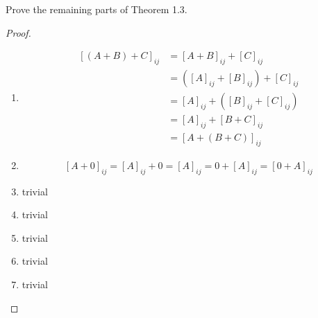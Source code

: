 \begin{problem} \label{P.1.5}
    Prove the remaining parts of Theorem 1.3. 
    
    \begin{proof}
        \begin{enumerate}
            \item
            \begin{align*}
            \left[(A+B)+C\right]_{ij} &= \left[A+B\right]_{ij} + \left[C\right]_{ij} \\
            &= (\left[A\right]_{ij} + \left[B\right]_{ij}) + \left[C\right]_{ij} \\
            &= \left[A\right]_{ij} + (\left[B\right]_{ij} + \left[C\right]_{ij}) \\
            &= \left[A\right]_{ij} + \left[B+C\right]_{ij} \\
            &= \left[A+(B+C)\right]_{ij}
            \end{align*}
            
            \item
            \[
            \left[ A+0 \right]_{ij} = \left[ A \right]_{ij} + 0 = \left[ A \right]_{ij} = 0 + \left[ A \right]_{ij} = \left[ 0+A \right]_{ij}
            \]
            
            \item trivial
            
            \item trivial
            
            \item trivial
            
            \item trivial 
            
            \item trivial
        \end{enumerate}
    \end{proof}
\end{problem}

